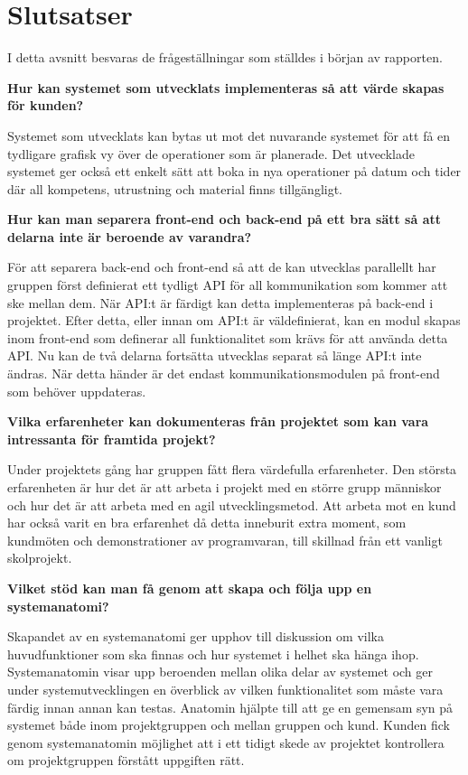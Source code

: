\chapter{Slutsatser}
I detta avsnitt besvaras de frågeställningar som ställdes i början av rapporten.

\textbf{Hur kan systemet som utvecklats implementeras så att värde skapas för kunden?}

Systemet som utvecklats kan bytas ut mot det nuvarande systemet för att få en tydligare grafisk vy över de operationer som är planerade. Det utvecklade systemet ger också ett enkelt sätt att boka in nya operationer på datum och tider där all kompetens, utrustning och material finns tillgängligt.

\textbf{Hur kan man separera front-end och back-end på ett bra sätt så att delarna inte är beroende av varandra?}

För att separera back-end och front-end så att de kan utvecklas parallellt har gruppen först definierat ett tydligt API för all kommunikation som kommer att ske mellan dem. När API:t är färdigt kan detta implementeras på back-end i projektet. Efter detta, eller innan om API:t är väldefinierat, kan en modul skapas inom front-end som definerar all funktionalitet som krävs för att använda detta API. Nu kan de två delarna fortsätta utvecklas separat så länge API:t inte ändras. När detta händer är det endast kommunikationsmodulen på front-end som behöver uppdateras.

\textbf{Vilka erfarenheter kan dokumenteras från projektet som kan vara intressanta för framtida projekt?}

Under projektets gång har gruppen fått flera värdefulla erfarenheter. Den största erfarenheten är hur det är att arbeta i projekt med en större grupp människor och hur det är att arbeta med en agil utvecklingsmetod. Att arbeta mot en kund har också varit en bra erfarenhet då detta inneburit extra moment, som kundmöten och demonstrationer av programvaran, till skillnad från ett vanligt skolprojekt.

\textbf{Vilket stöd kan man få genom att skapa och följa upp en systemanatomi?}

Skapandet av en systemanatomi ger upphov till diskussion om vilka huvudfunktioner som ska finnas och hur systemet i helhet ska hänga ihop. Systemanatomin visar upp beroenden mellan olika delar av systemet och ger under systemutvecklingen en överblick av vilken funktionalitet som måste vara färdig innan annan kan testas. Anatomin hjälpte till att ge en gemensam syn på systemet både inom projektgruppen och mellan gruppen och kund. Kunden fick genom systemanatomin möjlighet att i ett tidigt skede av projektet kontrollera om projektgruppen förstått uppgiften rätt.    
